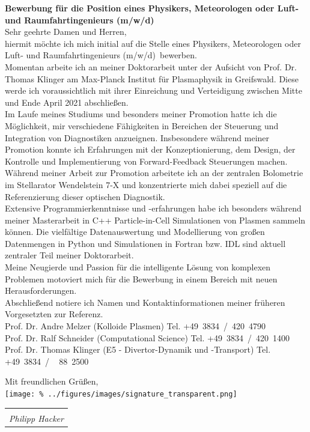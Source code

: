 \documentclass[11pt,a4paper]{moderncv}
\makeatletter
\newcommand{\position}{%
    Physikers, Meteorologen oder Luft- und Raumfahrtingenieurs (m/w/d)}
\newcommand{\sign}[1]{%
  \begin{tabular}[t]{@{}l@{}}
  \makebox[1.5in]{\dotfill}\\
  \strut\emph{#1}\strut%
  \end{tabular}%
}
\makeatother
\begin{document}
    \vspace*{1.0cm}
    {\bfseries \color{familynamecolor}%
        Bewerbung für die Position eines \position%
    }\\[0.75cm]
%
    Sehr geehrte Damen und Herren,\\[0.5cm]
%
    hiermit möchte ich mich initial auf die Stelle eines \position~bewerben.
    \\[0.5cm]  %
%
    Momentan arbeite ich an meiner Doktorarbeit unter der Aufsicht von Prof. Dr. Thomas Klinger am Max-Planck Institut für Plasmaphysik in Greifswald. Diese werde ich voraussichtlich mit ihrer Einreichung und Verteidigung zwischen Mitte und Ende April 2021 abschließen.\\[0.5cm]%
%
    Im Laufe meines Studiums und besonders meiner Promotion hatte ich die Möglichkeit, mir verschiedene Fähigkeiten in Bereichen der Steuerung und Integration von Diagnostiken anzueignen. Insbesondere während meiner Promotion konnte ich Erfahrungen mit der Konzeptionierung, dem Design, der Kontrolle und Implementierung von Forward-Feedback Steuerungen machen. Während meiner Arbeit zur Promotion arbeitete ich an der zentralen Bolometrie im Stellarator Wendelstein 7-X und konzentrierte mich dabei speziell auf die Referenzierung dieser optischen Diagnostik.\\[0.5cm]%
%
    Extensive Programmierkenntnisse und -erfahrungen habe ich besonders während meiner Masterarbeit in C++ Particle-in-Cell Simulationen von Plasmen sammeln können. Die vielfältige Datenauswertung und Modellierung von großen Datenmengen in Python und Simulationen in Fortran bzw. IDL sind aktuell zentraler Teil meiner Doktorarbeit.\\[0.5cm]%
%
    Meine Neugierde und Passion für die intelligente Lösung von komplexen Problemen motoviert mich für die Bewerbung in einem Bereich mit neuen Herausforderungen.\\[0.5cm]%
%
    Abschließend notiere ich Namen und Kontaktinformationen meiner früheren Vorgesetzten zur Referenz.\\[0.2cm]
    \hspace*{0.5cm}Prof. Dr. Andre Melzer (Kolloide Plasmen)%
        \hfill Tel. +49~3834~/~420~4790\\
    \hspace*{0.5cm}Prof. Dr. Ralf Schneider (Computational Science)%
        \hfill Tel. +49~3834~/~420~1400\\
    \hspace*{0.5cm}Prof. Dr. Thomas Klinger (E5 - Divertor-Dynamik und -Transport)%
        \hfill Tel. +49~3834~/~~\,88~2500\\
%
    \vspace*{0.3cm}
    \begin{flushleft}
        Mit freundlichen Grüßen,\\[0.75cm]
        \vspace*{-1.0cm}%
        \texttt{[image: \%
            ../figures/images/signature\_transparent.png]}
        \hspace*{-4.0cm}\sign{Philipp Hacker}\\[0.0cm]
    \end{flushleft}
    \newpage
\end{document}

